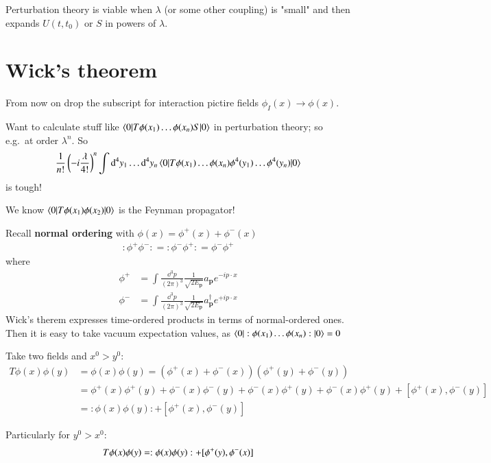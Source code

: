 Perturbation theory is viable when $\lambda$ (or some other coupling) is "small" and then expands $U(t,t_0)$ or $S$ in powers of $\lambda$.

\section{Wick's theorem}
From now on drop the subscript for interaction pictire fields $\phi_I(x) \rightarrow \phi(x)$.

Want to calculate stuff like $\braket{0 | T\phi(x_1)\dots\phi(x_n)S | 0}$ in perturbation theory; so e.g.\ at order $\lambda^n$. So 
\begin{align}
\frac{1}{n!} \left( -i\frac{\lambda}{4!} \right)^n \int \dd^4 y_1 \dots \dd^4 y_n \braket{0 | T\phi(x_1)\dots\phi(x_n)\phi^4(y_1)\dots\phi^4(y_n) | 0}
\end{align}
is tough!

We know $\braket{0 | T\phi(x_1)\phi(x_2) | 0 } $ is the Feynman propagator!

Recall \textbf{normal ordering} with $\phi(x) = \phi^+(x) + \phi^-(x)$
\begin{align}
	:\phi^+ \phi^-: = :\phi^- \phi^+: = \phi^- \phi^+
\end{align} 
where
\begin{align*}
\phi^+ &= \int \frac{\dd^3 p}{(2\pi)^3} \frac{1}{\sqrt{2E_{\pmb{p}}}} a_{\pmb{p}} e^{-ip\cdot x} \\
	\phi^- &= \int \frac{\dd^3 p}{(2\pi)^3} \frac{1}{\sqrt{2E_{\pmb{p}}}} a^\dagger_{\pmb{p}} e^{+ip\cdot x}
\end{align*}
Wick's therem expresses time-ordered products in terms of normal-ordered ones. Then it is easy to take vacuum expectation values, as $\braket{0 | :\phi(x_1)\dots\phi(x_n):|0} = 0$

Take two fields and $x^0 > y^0$:
\begin{align*}
	T \phi(x)\phi(y) &= \phi(x)\phi(y) = \left(\phi^+(x)+\phi^-(x)\right)\left(\phi^+(y)+\phi^-(y)\right) \\
	&= \phi^+(x)\phi^+(y) + \phi^-(x)\phi^-(y) + \phi^-(x) \phi^+(y) + \phi^-(x) \phi^+(y) + [\phi^+(x), \phi^-(y)] \\
	&= :\phi(x)\phi(y): + [\phi^+(x),\phi^-(y)]
\end{align*} 

Particularly for $y^0 > x^0$: 
\begin{align}
	T\phi(x)\phi(y) = :\phi(x)\phi(y): + [\phi^+(y),\phi^-(x)] \notag
\end{align}

